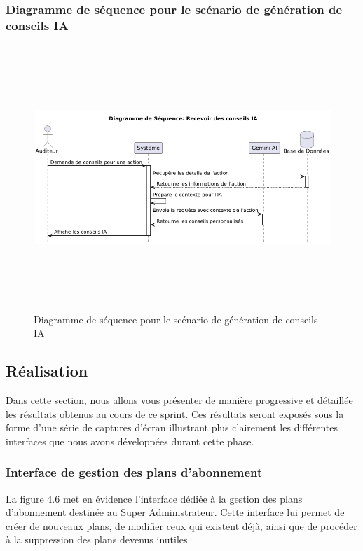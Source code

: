 \subsubsection{Diagramme de séquence pour le scénario de génération de conseils IA}
\begin{figure}[H]
    \centering
    \includegraphics[width=13cm,height=10cm]{images/aiconseilseq.png}
    \caption{Diagramme de séquence pour le scénario de génération de conseils IA}
\end{figure}

\subsection{Réalisation}
\noindent Dans cette section, nous allons vous présenter de manière progressive et détaillée les résultats obtenus au cours de ce sprint. Ces résultats seront exposés sous la forme d’une série de captures d’écran illustrant plus clairement les différentes interfaces que nous avons développées durant cette phase.

\subsubsection{Interface de gestion des plans d'abonnement}
\noindent La figure 4.6 met en évidence l’interface dédiée à la gestion des plans d’abonnement destinée au Super Administrateur. Cette interface lui permet de créer de nouveaux plans, de modifier ceux qui existent déjà, ainsi que de procéder à la suppression des plans devenus inutiles.

